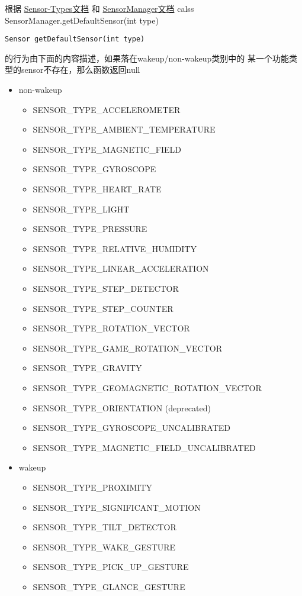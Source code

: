 \par{
根据
\href{https://source.android.com/devices/sensors/sensor-types.html}
     {Sensor-Types文档}
和
\href{https://developer.android.com/reference/android/hardware/SensorManager.html}{SensorManager文档}
calss SensorManager.getDefaultSensor(int type)
\begin{lstlisting}
Sensor getDefaultSensor(int type)
\end{lstlisting}
的行为由下面的内容描述，如果落在wakeup/non-wakeup类别中的
某一个功能类型的sensor不存在，那么函数返回null
\begin{itemize}
  \scriptsize
    \item non-wakeup
      \begin{itemize}
      \item SENSOR\_TYPE\_ACCELEROMETER
      \item SENSOR\_TYPE\_AMBIENT\_TEMPERATURE
      \item SENSOR\_TYPE\_MAGNETIC\_FIELD
      \item SENSOR\_TYPE\_GYROSCOPE
      \item SENSOR\_TYPE\_HEART\_RATE
      \item SENSOR\_TYPE\_LIGHT
      \item SENSOR\_TYPE\_PRESSURE
      \item SENSOR\_TYPE\_RELATIVE\_HUMIDITY
      \item SENSOR\_TYPE\_LINEAR\_ACCELERATION
      \item SENSOR\_TYPE\_STEP\_DETECTOR
      \item SENSOR\_TYPE\_STEP\_COUNTER
      \item SENSOR\_TYPE\_ROTATION\_VECTOR
      \item SENSOR\_TYPE\_GAME\_ROTATION\_VECTOR
      \item SENSOR\_TYPE\_GRAVITY
      \item SENSOR\_TYPE\_GEOMAGNETIC\_ROTATION\_VECTOR
      \item SENSOR\_TYPE\_ORIENTATION (deprecated)
      \item SENSOR\_TYPE\_GYROSCOPE\_UNCALIBRATED
      \item SENSOR\_TYPE\_MAGNETIC\_FIELD\_UNCALIBRATED
      \end{itemize}
    \item wakeup
      \begin{itemize}
      \item SENSOR\_TYPE\_PROXIMITY
      \item SENSOR\_TYPE\_SIGNIFICANT\_MOTION
      \item SENSOR\_TYPE\_TILT\_DETECTOR
      \item SENSOR\_TYPE\_WAKE\_GESTURE
      \item SENSOR\_TYPE\_PICK\_UP\_GESTURE
      \item SENSOR\_TYPE\_GLANCE\_GESTURE
      \end{itemize}
\end{itemize}

}
